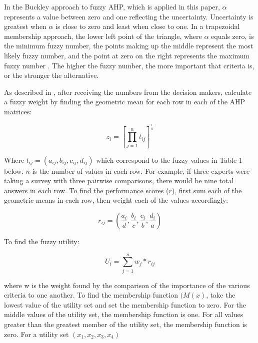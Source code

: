 \documentclass[12pt]{UIdahoMastersThesis}
\begin{document}
 In the Buckley approach to fuzzy AHP, which is applied in this paper, $\alpha$ represents a value between zero and one reflecting the uncertainty.  Uncertainty is greatest when $\alpha$ is close to zero and least when close to one. In a trapezoidal membership approach, the lower left point of the triangle, where $\alpha$ equals zero, is the minimum fuzzy number, the points making up the middle represent the most likely fuzzy number, and the point at zero on the right represents the maximum fuzzy number \cite{Pan2008}. The higher the fuzzy number, the more important that criteria is, or the stronger the alternative.
%
%

 As described in \cite{Kahraman2010}, after receiving the numbers from the decision makers, calculate a fuzzy weight by finding the geometric mean for each row in each of the AHP matrices:

 \begin{equation}
 z_i=[\prod_{j=1}^n t_{ij}]^{\frac{1}{n}}
 \end{equation}

 Where $t_{ij}=(a_{ij},b_{ij}, c_{ij}, d_{ij})$ which correspond to the fuzzy values in Table 1 below. $n$ is the number of values in each row.  For example, if three experts were taking a survey with three pairwise comparisons, there would be nine total answers in each row. To find the performance scores ($r$), first sum each of the geometric means in each row, then weight each of the values accordingly:

\begin{equation}
r_{ij}=(\frac{a_i}{d},\frac{b_i}{c},\frac{c_i}{b},\frac{d_i}{a})
\end{equation}

To find the fuzzy utility:

\begin{equation}
U_i=\sum_{j=1}^n w_j*r_{ij}
\end{equation}

where w is the weight found by the comparison of the importance of the various criteria to one another. To find the membership function $(M(x)$, take the lowest value of the utility set and set the membership function to zero.  For the middle values of the utility set, the membership function is one. For all values greater than the greatest member of the utility set, the membership function is zero. For a utility set $(x_1,x_2,x_3,x_4)$
\end{document}
